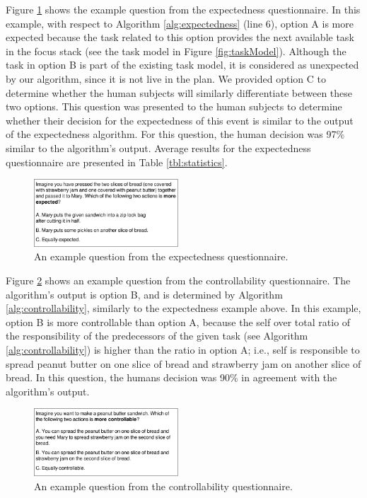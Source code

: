 \documentclass{aamas2016}
\begin{document}
Figure \ref{fig:qs1} shows the example question from the expectedness
questionnaire. In this example, with respect to Algorithm
\ref{alg:expectedness} (line 6), option A is more expected because the task
related to this option provides the next available task in the focus stack (see
the task model in Figure \ref{fig:taskModel}). Although the task in option B is
part of the existing task model, it is considered as unexpected by our
algorithm, since it is not live in the plan. We provided option C to determine
whether the human subjects will similarly differentiate between these two
options. This question was presented to the human subjects to determine whether
their decision for the expectedness of this event is similar to the output of
the expectedness algorithm. For this question, the human decision was 97\%
similar to the algorithm's output. Average results for the expectedness
questionnaire are presented in Table \ref{tbl:statistics}.

\begin{figure}[tbh]
  \centering
  \includegraphics[width=0.48\textwidth]{figure/question-sample-croped.pdf}
  \caption{{\fontsize{9}{9}\selectfont An example question from the expectedness
  questionnaire.}}
  \label{fig:qs1}
  \vspace*{-3mm}
\end{figure}

Figure \ref{fig:qs2} shows an example question from the controllability
questionnaire. The algorithm's output is option B, and is determined by
Algorithm \ref{alg:controllability}, similarly to the expectedness example
above. In this example, option B is more controllable than option A, because the
self over total ratio of the responsibility of the predecessors of the given
task (see Algorithm \ref{alg:controllability}) is higher than the ratio in
option A; i.e., self is responsible to spread peanut butter on one slice of
bread and strawberry jam on another slice of bread. In this question, the humans
decision was 90\% in agreement with the algorithm's output.

\begin{figure}[tbh]
  \centering
  \includegraphics[width=0.48\textwidth]{figure/question-sample2-croped.pdf}
  \caption{{\fontsize{9}{9}\selectfont An example question from the
  controllability questionnaire.}}
  \label{fig:qs2}
  \vspace*{-3mm}
\end{figure}
\end{document}
